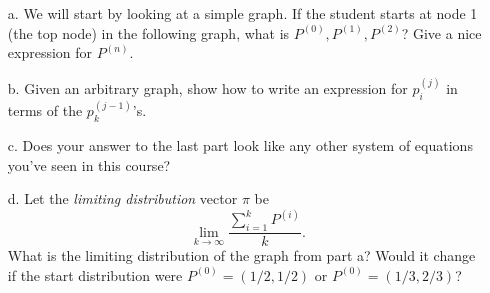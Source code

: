 \documentclass[12pt]{article}
\newcommand{\mfigure}[3]{\bigskip\centerline{\resizebox{#1}{#2}{\texttt{[image: \#3]}}}\bigskip}
\begin{document}
\begin{itemize}
\item[a.]
\label{parta}
We will start by looking at a simple graph. If the student starts at node 1 (the top node) in the following graph,
what is $P^{(0)},P^{(1)},P^{(2)}$?  Give a nice expression 
for $P^{(n)}$.  

\mfigure{!}{1.5in}{loop}


%
\item[b.]
Given an arbitrary graph, show how to 
write an expression for $p_i^{(j)}$ in terms of the $p_k^{(j-1)}$'s. 


\item[c.]
Does your answer to the last part look like any other system of equations you've seen in this course?



\item[d.]
Let the {\em limiting distribution} vector $\pi$ be
$$\lim_{k \rightarrow \infty} \frac{\sum_{i = 1}^{k} P^{(i)}}{k}.$$
What is the limiting distribution of the graph from part a?
Would it change if the start distribution 
were $P^{(0)}=(1/2,1/2)$ or $P^{(0)}=(1/3,2/3)$?



\end{itemize}
\end{document}
